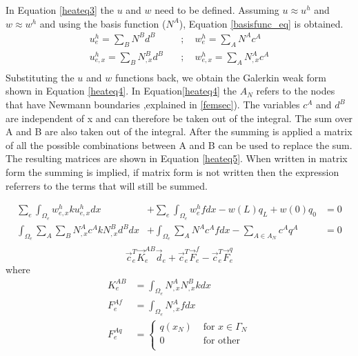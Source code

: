 	In Equation \ref{heateq3} the $u$ and $w$ need to be defined.
	Assuming $u \approx u^h$ and $w \approx w^h$ and using the basis function ($N^A$), Equation \ref{basisfunc_eq} is obtained.
	\begin{equation}
	\label{basisfunc_eq}
	\begin{aligned}
	u_e^h = \sum_{B} N^B d^B  \quad &;\quad w_e^h = \sum_{A} N^A c^A\\
	u_{e,x}^h = \sum_{B} N_{,x}^B d^B \quad &;\quad w_{e,x}^h=\sum_A N_{,x}^A c^A\\
	\end{aligned}
	\end{equation}		
	Substituting the $u$ and $w$ functions back, we obtain the Galerkin weak form shown in Equation \ref{heateq4}.
	In Equation\ref{heateq4} the $A_N$ refers to the nodes that have Newmann boundaries ,explained in \ref{femsec}). 
	The variables $c^A$ and $d^B$ are independent of x and can therefore be taken out of the integral. 
	The sum over A and B are also taken out of the integral.
	After the summing is applied a matrix of all the possible combinations between A and B can be used to replace the sum. The resulting matrices are shown in Equation \ref{heateq5}. 
	When written in matrix form the summing is implied, if matrix form is not written then the expression referrers to the terms that will still be summed.

	\begin{equation}
	\label{heateq4}
	\begin{aligned}
	\sum_e \int_{\Omega_e} w_{e,x}^h k  u_{e,x}^h dx &+ \sum_e \int_{\Omega_e} w_e^h f dx - w(L)q_L + w(0)q_0 &= 0\\
	\int_{\Omega_e} \sum_A \sum_B N_{,x}^A c^A k N_{,x}^B d^B dx  &+ \int_{\Omega_e} \sum_{A} N^A c^A f dx - \sum_{A\in A_N} c^A q^A &= 0\\
	\end{aligned}
	\end{equation}
	\begin{equation}
	\label{heateq5}
	\vec{c}_e^T \vec{K}_e^{AB} \vec{d}_e + \vec{c}_e^T \vec{F}_e^f -\vec{c}_e^T \vec{F}_e^q
	\end{equation}
	where
	\begin{equation*}
	\begin{aligned}
	K_e^{AB} &= \int_{\Omega_e}N_{,x}^AN_{,x}^B k dx\\
	F_e^{Af} &= \int_{\Omega_e}N_{,x}^A f dx\\
	F_e^{Aq} &= \begin{cases} q(x_N) &\text{ for } x \in \Gamma_N\\0 &\text{ for other }\\
	\end{cases}
	\end{aligned}
	\end{equation*}
	
